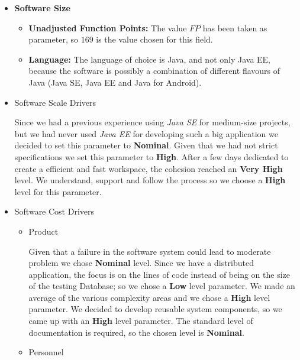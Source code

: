 \begin{itemize}
	\item \textbf{Software Size}
	\begin{itemize}
		\item \textbf{Unadjusted Function Points:} The value $FP$ has been taken as parameter, so $169$ is the value chosen for this field.
		\item \textbf{Language:} The language of choice is Java, and not only Java EE, because the software is possibly a combination of different flavours of Java (Java SE, Java EE and Java for Android).
	\end{itemize}
	\item Software Scale Drivers
	\begin{itemize}
		 Since we had a previous experience using \textit{Java SE} for medium-size projects, but we had never used \textit{Java EE} for developing such a big application we decided to set this parameter to \textbf{Nominal}.
		 Given that we had not strict specifications we set this parameter to \textbf{High}.
		 After a few days dedicated to create a efficient and fast workspace, the cohesion reached an \textbf{Very High} level.
		 We understand, support and follow the process so we choose a \textbf{High} level for this parameter.
	\end{itemize}
	\item Software Cost Drivers
	\begin{itemize}
		\item Product
		\begin{itemize}
			\itemBold{Required Software Reliability}
			Given that a failure in the software system could lead to moderate problem we chose \textbf{Nominal} level.
			 Since we have a distributed application, the focus is on the lines of code instead of being on the size of the testing Database; so we chose a \textbf{Low} level parameter.
			 We made an average of the various complexity areas and we chose a \textbf{High} level parameter.
			 We decided to develop reusable system components, so we came up with an \textbf{High} level parameter.
			 The standard level of documentation is required, so the chosen level is \textbf{Nominal}.
		\end{itemize}
		\item Personnel

\end{itemize}
\end{itemize}

